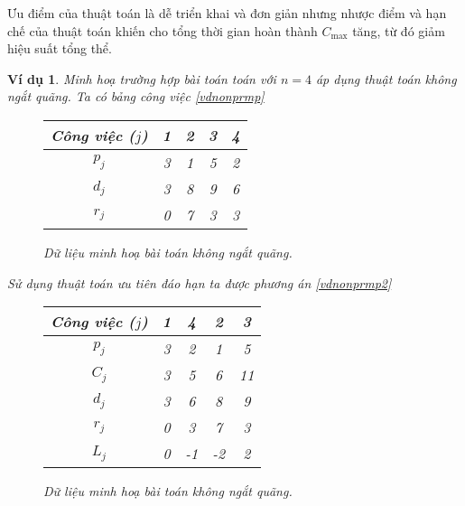 \documentclass[12pt,a4paper]{report}
\newtheorem{vd}{Ví dụ}
\begin{document}
Ưu điểm của thuật toán là dễ triển khai và đơn giản nhưng nhược điểm và hạn chế của thuật toán khiến cho tổng thời gian hoàn thành $C_{\max}$ tăng, từ đó giảm hiệu suất tổng thể.
\begin{vd} \label{kongatquang}
Minh hoạ trường hợp bài toán toán với $n=4$ áp dụng thuật toán không ngắt quãng.
Ta có bảng công việc \eqref{vdnonprmp}

\begin{figure}[h!]
	\centering
		\begin{tabular}{|c | c c c c |} 
		\hline
		Công việc ($j$) & 1 & 2 & 3 & 4 \\
		\hline\hline
		$p_j$ & 3 & 1 & 5 & 2 \\
		\hline
		$d_j$ & 3 & 8 & 9 & 6 \\
		\hline
		$r_j$ & 0 & 7 & 3 & 3 \\
		\hline
		\end{tabular}
\caption{\label{vdnonprmp} Dữ liệu minh hoạ bài toán không ngắt quãng.}
\end{figure}

Sử dụng thuật toán ưu tiên đáo hạn ta được phương án \eqref{vdnonprmp2}
\begin{figure}[h!]
	\centering
		\begin{tabular}{|c | c c c c |} 
		\hline
		Công việc ($j$) & 1 & 4 & 2 & 3 \\
		\hline\hline
		$p_j$ & 3 & 2 & 1 & 5 \\
		\hline
		$C_j$ & 3 & 5 & 6 & 11 \\
		\hline
		$d_j$ & 3 & 6 & 8 & 9 \\
		\hline
		$r_j$ & 0 & 3 & 7 & 3 \\
		\hline
		$L_j$ & 0 & -1 & -2 & 2 \\
		\hline
		\end{tabular}
\caption{\label{vdnonprmp2} Dữ liệu minh hoạ bài toán không ngắt quãng.}
\end{figure}


\end{vd}
\end{document}
